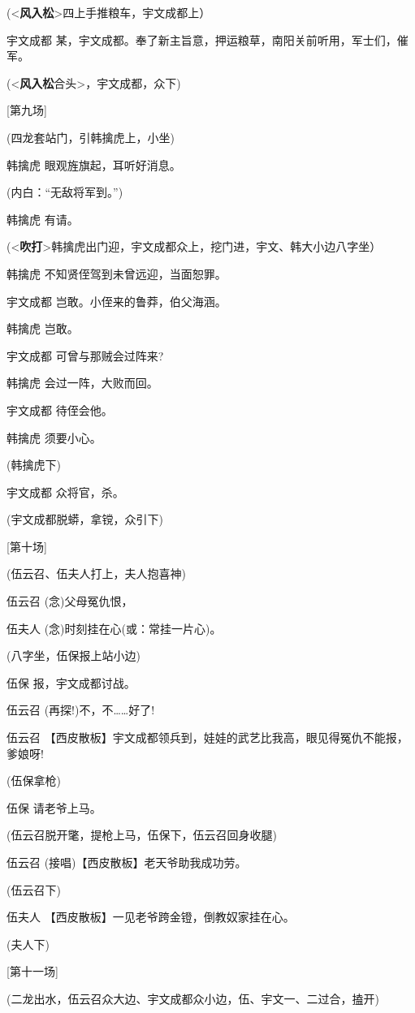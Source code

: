 (\textless{}\textbf{风入松}\textgreater{}四上手推粮车，宇文成都上）

宇文成都
某，宇文成都。奉了新主旨意，押运粮草，南阳关前听用，军士们，催军。

(\textless{}\textbf{风入松}合头\textgreater{}，宇文成都，众下)

{[}第九场{]}

(四龙套站门，引韩擒虎上，小坐)

韩擒虎 眼观旌旗起，耳听好消息。

(内白：``无敌将军到。'')

韩擒虎 有请。

(\textless{}\textbf{吹打}\textgreater{}韩擒虎出门迎，宇文成都众上，挖门进，宇文、韩大小边八字坐）

韩擒虎 不知贤侄驾到未曾远迎，当面恕罪。

宇文成都 岂敢。小侄来的鲁莽，伯父海涵。

韩擒虎 岂敢。

宇文成都 可曾与那贼会过阵来?

韩擒虎 会过一阵，大败而回。

宇文成都 待侄会他。

韩擒虎 须要小心。

(韩擒虎下)

宇文成都 众将官，杀。

(宇文成都脱蟒，拿镋，众引下)

{[}第十场{]}

(伍云召、伍夫人打上，夫人抱喜神)

伍云召 (念)父母冤仇恨，

伍夫人 (念)时刻挂在心(或：常挂一片心)。

(八字坐，伍保报上站小边)

伍保 报，宇文成都讨战。

伍云召 (再探!)不，不\ldots{}\ldots{}好了!

伍云召
【西皮散板】宇文成都领兵到，娃娃的武艺比我高，眼见得冤仇不能报，爹娘呀!

(伍保拿枪)

伍保 请老爷上马。

(伍云召脱开氅，提枪上马，伍保下，伍云召回身收腿)

伍云召 (接唱)【西皮散板】老天爷助我成功劳。

(伍云召下)

伍夫人 【西皮散板】一见老爷跨金镫，倒教奴家挂在心。

(夫人下)

{[}第十一场{]}

(二龙出水，伍云召众大边、宇文成都众小边，伍、宇文一、二过合，搕开)

